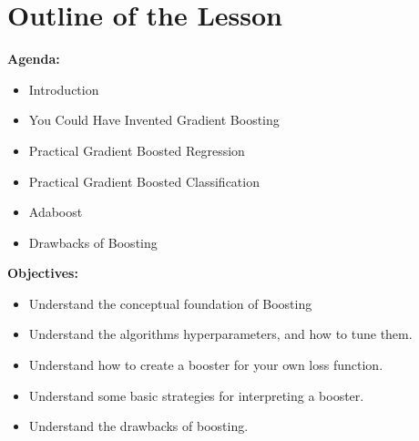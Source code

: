 \section{Outline of the Lesson}
%
\begin{frame}
\textbf{Agenda:}
 
  \begin{itemize}
    \item Introduction
    \item You Could Have Invented Gradient Boosting
    \item Practical Gradient Boosted Regression
    \item Practical Gradient Boosted Classification
    \item Adaboost
    \item Drawbacks of Boosting
  \end{itemize}

\end{frame}
%
\begin{frame}
\textbf{Objectives:}

  \begin{itemize}
    \item Understand the conceptual foundation of Boosting
    \item Understand the algorithms hyperparameters, and how to tune them.
    \item Understand how to create a booster for your own loss function.
    \item Understand some basic strategies for interpreting a booster.
    \item Understand the drawbacks of boosting.
  \end{itemize}
  
\end{frame}